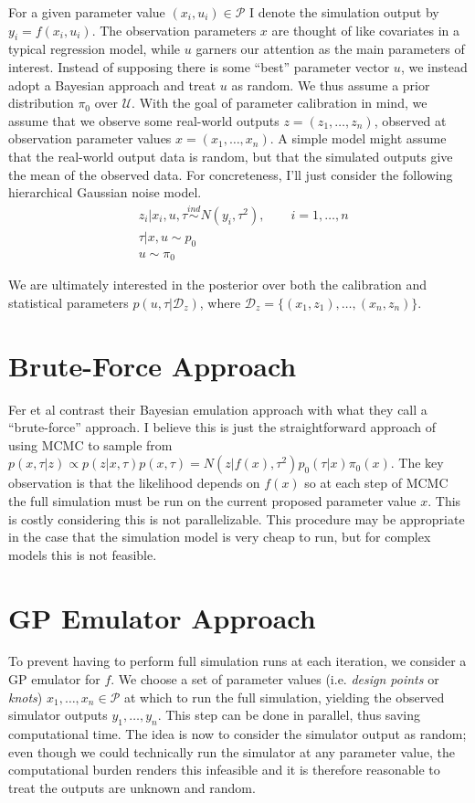 \documentclass[12pt]{article}
\begin{document}
For a given parameter value $(x_i, u_i) \in \mathcal{P}$ I denote the simulation output by $y_i = f(x_i, u_i)$.
The observation parameters $x$ are thought of like covariates in a typical regression model, while $u$ garners our attention as the main parameters of interest. Instead of supposing 
there is some ``best'' parameter vector $u$, we instead adopt a Bayesian approach and treat $u$ as random. 
 We thus assume a prior distribution $\pi_0$ over $\mathcal{U}$. 
With the goal of parameter calibration in mind, we assume that we observe some real-world outputs $z = (z_1, \dots, z_n)$, observed at observation parameter values 
$x = (x_1, \dots, x_n)$. A simple model might assume that the real-world output data is random, but that the simulated outputs give the mean of the observed data. 
For concreteness, I'll just consider the following hierarchical Gaussian noise model. 
\begin{align*}
&z_i|x_i, u, \tau \overset{ind}{\sim} N(y_i, \tau^2), \qquad i = 1, \dots, n \\
&\tau|x, u \sim p_0 \\
&u \sim \pi_0
\end{align*}

We are ultimately interested in the posterior over both the calibration and statistical parameters $p(u, \tau|\mathcal{D}_z)$, where $\mathcal{D}_z = \{(x_1, z_1), \dots, (x_n, z_n)\}$.  

\section{Brute-Force Approach}
Fer et al contrast their Bayesian emulation approach with what they call a ``brute-force'' approach. I believe this is just the straightforward approach of using MCMC to sample from 
$p(x, \tau|z) \propto p(z|x, \tau)p(x, \tau) = N(z|f(x), \tau^2)p_0(\tau|x)\pi_0(x)$. 
The key observation is that the likelihood depends on $f(x)$ so at each step of MCMC the full simulation must be run on the current proposed parameter value $x$. This is costly considering this is not parallelizable. This procedure may be appropriate in the case that the simulation model is very cheap to run, but for complex models this is not 
feasible. 

\section{GP Emulator Approach}
To prevent having to perform full simulation runs at each iteration, we consider a GP emulator for $f$. We choose a set of parameter values (i.e. \textit{design points} or \textit{knots}) $x_1, \dots, x_n \in \mathcal{P}$ at which to run the full simulation, yielding the observed simulator outputs $y_1, \dots, y_n$. This step can be done in parallel, 
thus saving computational time. The idea is now to consider the simulator output as random; even though we could technically run the simulator at any parameter value, the 
computational burden renders this infeasible and it is therefore reasonable to treat the outputs are unknown and random. 
\end{document}
